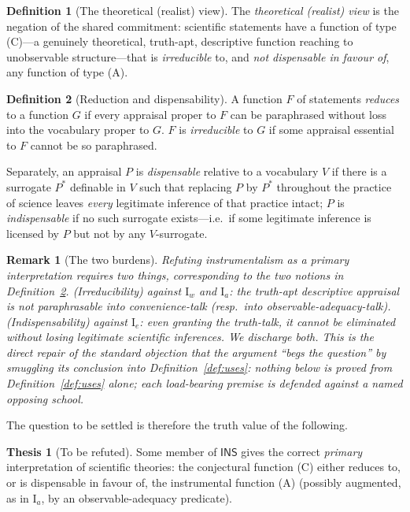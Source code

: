 \documentclass{amsart}
\theoremstyle{definition}
\newtheorem{definition}{Definition}
\newtheorem{thesis}{Thesis}
\theoremstyle{plain}
\newtheorem{remark}{Remark}
\begin{document}
\begin{definition}[The theoretical (realist) view]\label{def:realist}
The \emph{theoretical (realist) view} is the negation of the shared commitment:
scientific statements have a function of type (C)---a genuinely theoretical,
truth-apt, descriptive function reaching to unobservable structure---that is
\emph{irreducible} to, and \emph{not dispensable in favour of}, any function of
type (A).
\end{definition}

\begin{definition}[Reduction and dispensability]\label{def:reduce}
A function $F$ of statements \emph{reduces} to a function $G$ if every appraisal
proper to $F$ can be paraphrased without loss into the vocabulary proper to $G$.
$F$ is \emph{irreducible} to $G$ if some appraisal essential to $F$ cannot be so
paraphrased.

Separately, an appraisal $P$ is \emph{dispensable} relative to a vocabulary $V$
if there is a surrogate $P^{*}$ definable in $V$ such that replacing $P$ by
$P^{*}$ throughout the practice of science leaves \emph{every} legitimate
inference of that practice intact; $P$ is \emph{indispensable} if no such
surrogate exists---i.e.\ if some legitimate inference is licensed by $P$ but not
by any $V$-surrogate.
\end{definition}

\begin{remark}[The two burdens]\label{rem:burdens}
Refuting instrumentalism \emph{as a primary interpretation} requires two
things, corresponding to the two notions in
Definition~\ref{def:reduce}. \emph{(Irreducibility)} against $\mathrm I_w$ and
$\mathrm I_a$: the truth-apt descriptive appraisal is not paraphrasable into
convenience-talk (resp.\ into observable-adequacy-talk). \emph{(Indispensability)}
against $\mathrm I_e$: even granting the truth-talk, it cannot be eliminated
without losing legitimate scientific inferences. We discharge both. This is the
direct repair of the standard objection that the argument ``begs the question''
by smuggling its conclusion into Definition~\ref{def:uses}: nothing below is
proved from Definition~\ref{def:uses} alone; each load-bearing premise is
defended against a named opposing school.
\end{remark}

The question to be settled is therefore the truth value of the following.

\begin{thesis}[To be refuted]\label{th:inst}
Some member of $\mathsf{INS}$ gives the correct \emph{primary} interpretation of
scientific theories: the conjectural function \textup{(C)} either reduces to, or
is dispensable in favour of, the instrumental function \textup{(A)} (possibly
augmented, as in $\mathrm I_a$, by an observable-adequacy predicate).
\end{thesis}
\end{document}
